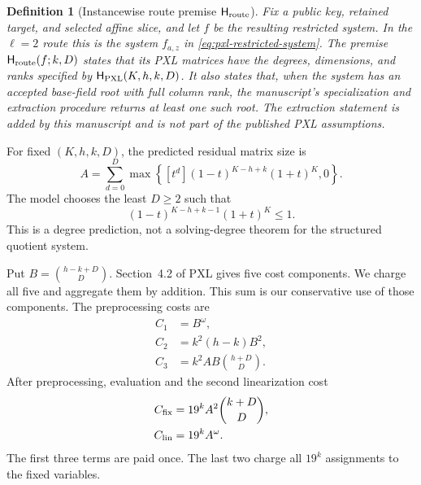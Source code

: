 \documentclass[11pt]{article}
\newtheorem{definition}[definition]{Definition}
\begin{document}
\begin{definition}[Instancewise route premise $\mathsf H_{\rm route}$]
\label{def:pxl-route}
Fix a public key, retained target, and selected affine slice, and let $f$ be
the resulting restricted system.  In the $\ell=2$ route this is the system
$f_{a,z}$ in \eqref{eq:pxl-restricted-system}.  The premise
$\mathsf H_{\rm route}(f;k,D)$ states that its PXL matrices have
the degrees, dimensions, and ranks specified by
$\mathsf H_{\rm PXL}(K,h,k,D)$.  It also states that, when the system has an
accepted base-field root with full column rank, the manuscript's
specialization and extraction procedure returns at least one such root.
The extraction statement is added by this manuscript and is not part of the
published PXL assumptions.
\end{definition}

For fixed $(K,h,k,D)$, the predicted residual matrix size is
\begin{equation}
 A=\sum_{d=0}^{D}
   \max\left\{
     [t^d](1-t)^{K-h+k}(1+t)^K,
     0
   \right\}.                                         \label{eq:pxl-A}
\end{equation}
The model chooses the least $D\ge2$ such that
\begin{equation}
 [t^D](1-t)^{K-h+k-1}(1+t)^K\le1.                   \label{eq:pxl-degree}
\end{equation}
This is a degree prediction, not a solving-degree theorem for the structured
quotient system.

Put $B=\binom{h-k+D}{D}$.  Section~4.2 of PXL gives five cost components.
We charge all five and aggregate them by addition.  This sum is our
conservative use of those components.  The preprocessing costs are
\begin{align}
 C_1&=B^\omega,                                      \label{eq:pxl-C1}\\
 C_2&=k^2(h-k)B^2,                                   \label{eq:pxl-C2}\\
 C_3&=k^2AB\binom{h+D}{D}.                           \label{eq:pxl-C3}
\end{align}
After preprocessing, evaluation and the second linearization cost
\begin{align}
 C_{\rm fix}&=19^kA^2\binom{k+D}{D},                \label{eq:pxl-Cfix}\\
 C_{\rm lin}&=19^kA^\omega.                         \label{eq:pxl-Clin}
\end{align}
The first three terms are paid once.  The last two charge all $19^k$
assignments to the fixed variables.
\end{document}
